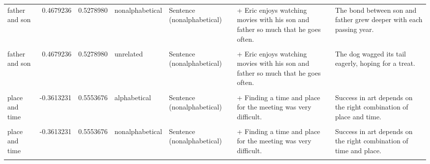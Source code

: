 \documentclass[
  12pt,
]{scrartcl}
\begin{document}
\begin{landscape}
\begin{longtable}{lrrllll}
father and son & 0.4679236 & 0.5278980 & nonalphabetical & Sentence (nonalphabetical) & + Eric enjoys watching movies with his son and father so much that he goes often. & The bond between son and father grew deeper with each passing year.\\
\cellcolor{gray!6}{father and son} & \cellcolor{gray!6}{0.4679236} & \cellcolor{gray!6}{0.5278980} & \cellcolor{gray!6}{unrelated} & \cellcolor{gray!6}{Sentence (alphabetical)} & \cellcolor{gray!6}{+ Eric enjoys watching movies with his father and son so much that he goes often.} & \cellcolor{gray!6}{The dog wagged its tail eagerly, hoping for a treat.}\\
father and son & 0.4679236 & 0.5278980 & unrelated & Sentence (nonalphabetical) & + Eric enjoys watching movies with his son and father so much that he goes often. & The dog wagged its tail eagerly, hoping for a treat.\\
\cellcolor{gray!6}{place and time} & \cellcolor{gray!6}{-0.3613231} & \cellcolor{gray!6}{0.5553676} & \cellcolor{gray!6}{alphabetical} & \cellcolor{gray!6}{Sentence (alphabetical)} & \cellcolor{gray!6}{+ Finding a place and time for the meeting was very difficult.} & \cellcolor{gray!6}{Success in art depends on the right combination of place and time.}\\
\addlinespace
place and time & -0.3613231 & 0.5553676 & alphabetical & Sentence (nonalphabetical) & + Finding a time and place for the meeting was very difficult. & Success in art depends on the right combination of place and time.\\
\cellcolor{gray!6}{place and time} & \cellcolor{gray!6}{-0.3613231} & \cellcolor{gray!6}{0.5553676} & \cellcolor{gray!6}{nonalphabetical} & \cellcolor{gray!6}{Sentence (alphabetical)} & \cellcolor{gray!6}{+ Finding a place and time for the meeting was very difficult.} & \cellcolor{gray!6}{Success in art depends on the right combination of time and place.}\\
place and time & -0.3613231 & 0.5553676 & nonalphabetical & Sentence (nonalphabetical) & + Finding a time and place for the meeting was very difficult. & Success in art depends on the right combination of time and place.\\
\cellcolor{gray!6}{place and time} & \cellcolor{gray!6}{-0.3613231} & \cellcolor{gray!6}{0.5553676} & \cellcolor{gray!6}{unrelated} & \cellcolor{gray!6}{Sentence (alphabetical)} & \cellcolor{gray!6}{+ Finding a place and time for the meeting was very difficult.} & \cellcolor{gray!6}{A gentle breeze rustled the leaves, carrying the scent of jasmine through the air.}\\

\end{longtable}
\end{landscape}
\end{document}
